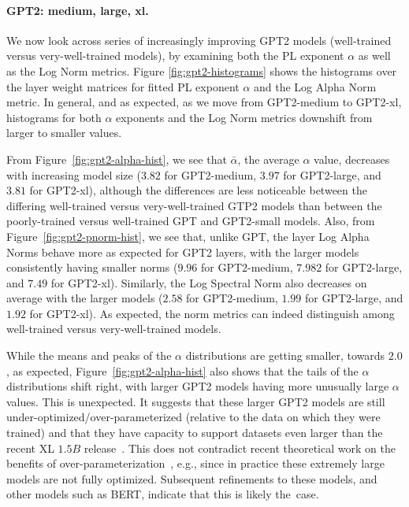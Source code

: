 \paragraph{GPT2: medium, large, xl.} 

We now look across series of increasingly improving GPT2 models (well-trained versus very-well-trained models), by examining both the PL exponent $\alpha$ as well as the Log Norm metrics.  
Figure \ref{fig:gpt2-histograms} shows the histograms over the layer weight matrices for fitted PL exponent $\alpha$ and the Log Alpha Norm metric. 
In general, and as expected, as we move from GPT2-medium to GPT2-xl, histograms for both $\alpha$ exponents and the Log Norm metrics downshift from larger to smaller values. 

From Figure~\ref{fig:gpt2-alpha-hist}, we see that
$\bar{\alpha}$, the average $\alpha$ value, decreases with increasing model size ($3.82$ for GPT2-medium, $3.97$ for GPT2-large, and $3.81$ for GPT2-xl), although the differences are less noticeable between the differing well-trained versus very-well-trained GTP2 models than between the poorly-trained versus well-trained GPT and GPT2-small models.
Also, from Figure~\ref{fig:gpt2-pnorm-hist}, we see that, 
unlike GPT, the layer Log Alpha Norms behave more as expected for GPT2 layers, with the larger models consistently having smaller norms ($9.96$ for GPT2-medium, $7.982$ for GPT2-large, and $7.49$ for GPT2-xl). 
Similarly, the Log Spectral Norm also decreases on average with the larger models ($2.58$ for GPT2-medium, $1.99$ for GPT2-large, and $1.92$ for GPT2-xl).
As expected, the norm metrics can indeed distinguish among well-trained versus very-well-trained models.


While the means and peaks of the $\alpha$ distributions are getting smaller, towards $2.0$, as expected, Figure~\ref{fig:gpt2-alpha-hist} also shows that the tails of the $\alpha$ distributions shift right, with larger GPT2 models having more unusually large $\alpha$ values.
This is unexpected.
It suggests that these larger GPT2 models are still under-optimized/over-parameterized (relative to the data on which they were trained) and that they have capacity to support datasets even larger than the recent XL $1.5B$ release~\cite{gpt2-xl}.
This does not contradict recent theoretical work on the benefits of over-parameterization~\cite{BHMM19}, e.g., since in practice these extremely large models are not fully optimized.
Subsequent refinements to these models, and other models such as BERT, indicate that this is likely the~case.

